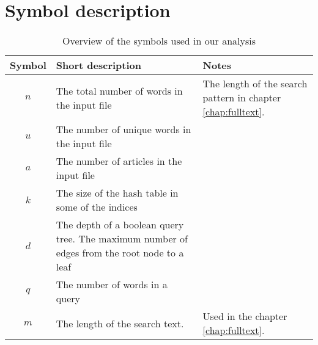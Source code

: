 \section*{Symbol description}

\vfill

\begin{table}[ht!]
    \centering
    \begin{tabular}{c|p{7.5cm}|p{4cm}}
        Symbol & Short description & Notes \\\hline
        $n$ & The total number of words in the input file & The length of the search pattern in chapter \ref{chap:fulltext}.  \\
        $u$ & The number of unique words in the input file &   \\
        $a$ & The number of articles in the input file &   \\
        $k$ & The size of the hash table in some of the indices &   \\
        $d$ & The depth of a boolean query tree. The maximum number of edges from the root node to a leaf  &   \\
        $q$ & The number of words in a query & \\
        $m$ & The length of the search text. & Used in the chapter \ref{chap:fulltext}.  \\
        
    \end{tabular}
    \caption{Overview of the symbols used in our analysis}
    \label{tab:symbol_desc}
\end{table}

\vfill

